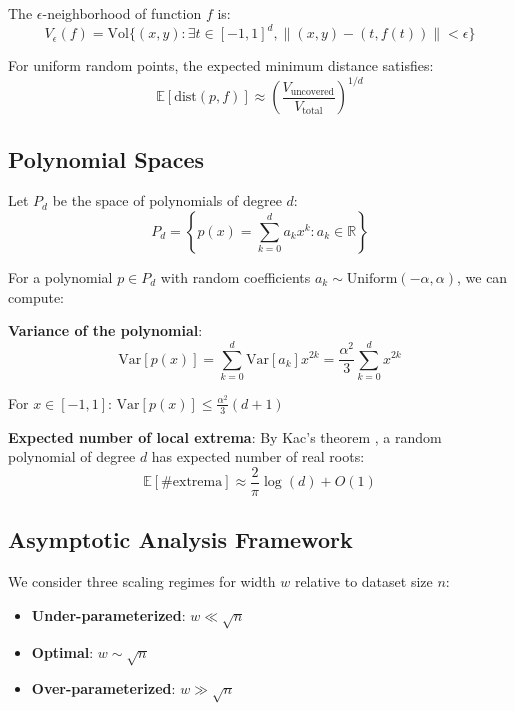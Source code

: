 \begin{definition}
The $\epsilon$-neighborhood of function $f$ is:
$$V_\epsilon(f) = \text{Vol}\{(x, y) : \exists t \in [-1,1]^d, \|(x, y) - (t, f(t))\| < \epsilon\}$$
\end{definition}

\begin{definition}
For uniform random points, the expected minimum distance satisfies:
$$\mathbb{E}[\text{dist}(p, f)] \approx \left(\frac{V_{\text{uncovered}}}{V_{\text{total}}}\right)^{1/d}$$
\end{definition}

\subsection{Polynomial Spaces}

Let $P_d$ be the space of polynomials of degree $d$:
$$P_d = \left\{p(x) = \sum_{k=0}^d a_k x^k : a_k \in \mathbb{R}\right\}$$

For a polynomial $p \in P_d$ with random coefficients $a_k \sim \text{Uniform}(-\alpha, \alpha)$, we can compute:

\textbf{Variance of the polynomial}:
$$\text{Var}[p(x)] = \sum_{k=0}^d \text{Var}[a_k] x^{2k} = \frac{\alpha^2}{3} \sum_{k=0}^d x^{2k}$$

For $x \in [-1, 1]$: $\text{Var}[p(x)] \leq \frac{\alpha^2}{3}(d + 1)$

\textbf{Expected number of local extrema}:
By Kac's theorem \cite{Kac1943ACT}, a random polynomial of degree $d$ has expected number of real roots:
$$\mathbb{E}[\#\text{extrema}] \approx \frac{2}{\pi} \log(d) + O(1)$$

\subsection{Asymptotic Analysis Framework}

\begin{definition}
We consider three scaling regimes for width $w$ relative to dataset size $n$:
\begin{itemize}
    \item \textbf{Under-parameterized}: $w \ll \sqrt{n}$
    \item \textbf{Optimal}: $w \sim \sqrt{n}$
    \item \textbf{Over-parameterized}: $w \gg \sqrt{n}$
\end{itemize}
\end{definition}


